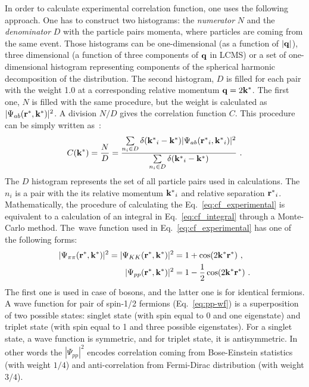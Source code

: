     In order to calculate experimental correlation function, one uses the following approach.
    One has to construct two histograms: the \textit{numerator} $N$ and the \textit{denominator} $D$ with the particle pairs momenta, where particles are coming from the same event.
    Those histograms can be one-dimensional (as a function of $|\mathbf{q}|$), three dimensional (a function of three components of $\mathbf{q}$ in LCMS) or a set of one-dimensional histogram representing components of the spherical harmonic decomposition of the distribution.
    The second histogram, $D$ is filled for each pair with the weight 1.0 at a corresponding relative momentum $\mathbf{q} = 2 \mathbf{k^*}$.
    The first one, $N$ is filled with the same procedure, but the weight is calculated as $|\Psi_{ab}(\mathbf{r^*},\mathbf{k^*})|^2$.
    A division $N/D$ gives the correlation function $C$.
    This procedure can be simply written as~\cite{nonidfemto}:
    \begin{equation}
      \label{eq:cf_experimental}
      C(\mathbf{k^*}) = \frac{N}{D} =  \frac{\sum\limits_{n_i \in D} \delta(\mathbf{k^*}_i - \mathbf{k^*}) |\Psi_{ab}(\mathbf{r^*}_i,\mathbf{k^*}_i)|^2 }{\sum\limits_{n_i \in D} \delta(\mathbf{k^*}_i - \mathbf{k^*})}~.
    \end{equation}
    The $D$ histogram represents the set of all particle pairs used in calculations.
    The~$n_i$ is a pair with the its relative momentum $\mathbf{k^*}_i$ and relative separation $\mathbf{r^*}_i$.
    Mathematically, the procedure of calculating the Eq.~\ref{eq:cf_experimental} is equivalent to a calculation of an integral in Eq.~\ref{eq:cf_integral} through a Monte-Carlo method.
    The~wave function used in Eq.~\ref{eq:cf_experimental} has one of the following forms:
    \begin{align}
      |\Psi_{\pi\pi}(\mathbf{r^*},\mathbf{k^*})|^2 = |\Psi_{KK}(\mathbf{r^*},\mathbf{k^*})|^2 &= 1 + \cos(2 \mathbf{k^*} \mathbf{r^*})~, \\
      \label{eq:pp-wf}
      |\Psi_{pp}(\mathbf{r^*},\mathbf{k^*})|^2 &= 1 - \frac{1}{2} \cos(2 \mathbf{k^*} \mathbf{r^*})~.
    \end{align}
    The first one is used in case of bosons, and the latter one is for identical fermions.
    A wave function for pair of spin-1/2 fermions (Eq.~\ref{eq:pp-wf}) is a superposition of two possible states: singlet state (with spin equal to 0 and one eigenstate) and triplet state (with spin equal to 1 and three possible eigenstates).
    For a singlet state, a wave function is symmetric, and for triplet state, it is antisymmetric.
    In other words the $|\Psi_{pp}|^2$ encodes correlation coming from Bose-Einstein statistics (with weight $1/4$) and anti-correlation from Fermi-Dirac distribution (with weight $3/4$).

